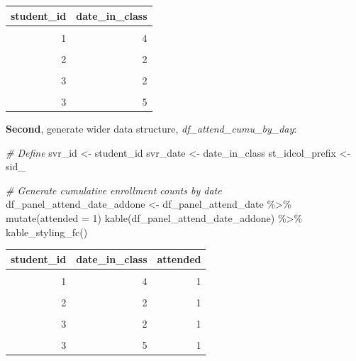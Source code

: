 \documentclass[
]{book}
\newenvironment{Shaded}{\begin{snugshade}}{\end{snugshade}}
\newcommand{\AttributeTok}[1]{\textcolor[rgb]{0.77,0.63,0.00}{#1}}
\newcommand{\CommentTok}[1]{\textcolor[rgb]{0.56,0.35,0.01}{\textit{#1}}}
\newcommand{\DecValTok}[1]{\textcolor[rgb]{0.00,0.00,0.81}{#1}}
\newcommand{\FunctionTok}[1]{\textcolor[rgb]{0.00,0.00,0.00}{#1}}
\newcommand{\NormalTok}[1]{#1}
\newcommand{\OtherTok}[1]{\textcolor[rgb]{0.56,0.35,0.01}{#1}}
\newcommand{\SpecialCharTok}[1]{\textcolor[rgb]{0.00,0.00,0.00}{#1}}
\newcommand{\StringTok}[1]{\textcolor[rgb]{0.31,0.60,0.02}{#1}}
\begin{document}
\begin{table}[!h]
\centering
\begin{tabular}{r|r}
\hline
student\_id & date\_in\_class\\
\hline
\cellcolor{gray!6}{1} & \cellcolor{gray!6}{2}\\
\hline
1 & 4\\
\hline
\cellcolor{gray!6}{2} & \cellcolor{gray!6}{1}\\
\hline
2 & 2\\
\hline
\cellcolor{gray!6}{2} & \cellcolor{gray!6}{5}\\
\hline
3 & 2\\
\hline
\cellcolor{gray!6}{3} & \cellcolor{gray!6}{3}\\
\hline
3 & 5\\
\hline
\end{tabular}
\end{table}

\textbf{Second}, generate wider data structure, \emph{df\_attend\_cumu\_by\_day}:

\begin{Shaded}
\begin{Highlighting}[]
\CommentTok{\# Define}
\NormalTok{svr\_id }\OtherTok{\textless{}{-}} \StringTok{\textquotesingle{}student\_id\textquotesingle{}}
\NormalTok{svr\_date }\OtherTok{\textless{}{-}} \StringTok{\textquotesingle{}date\_in\_class\textquotesingle{}}
\NormalTok{st\_idcol\_prefix }\OtherTok{\textless{}{-}} \StringTok{\textquotesingle{}sid\_\textquotesingle{}}

\CommentTok{\# Generate cumulative enrollment counts by date}
\NormalTok{df\_panel\_attend\_date\_addone }\OtherTok{\textless{}{-}}\NormalTok{ df\_panel\_attend\_date }\SpecialCharTok{\%\textgreater{}\%} \FunctionTok{mutate}\NormalTok{(}\AttributeTok{attended =} \DecValTok{1}\NormalTok{)}
\FunctionTok{kable}\NormalTok{(df\_panel\_attend\_date\_addone) }\SpecialCharTok{\%\textgreater{}\%}
  \FunctionTok{kable\_styling\_fc}\NormalTok{()}
\end{Highlighting}
\end{Shaded}

\begin{table}[!h]
\centering
\begin{tabular}{r|r|r}
\hline
student\_id & date\_in\_class & attended\\
\hline
\cellcolor{gray!6}{1} & \cellcolor{gray!6}{2} & \cellcolor{gray!6}{1}\\
\hline
1 & 4 & 1\\
\hline
\cellcolor{gray!6}{2} & \cellcolor{gray!6}{1} & \cellcolor{gray!6}{1}\\
\hline
2 & 2 & 1\\
\hline
\cellcolor{gray!6}{2} & \cellcolor{gray!6}{5} & \cellcolor{gray!6}{1}\\
\hline
3 & 2 & 1\\
\hline
\cellcolor{gray!6}{3} & \cellcolor{gray!6}{3} & \cellcolor{gray!6}{1}\\
\hline
3 & 5 & 1\\
\hline
\end{tabular}
\end{table}
\end{document}
